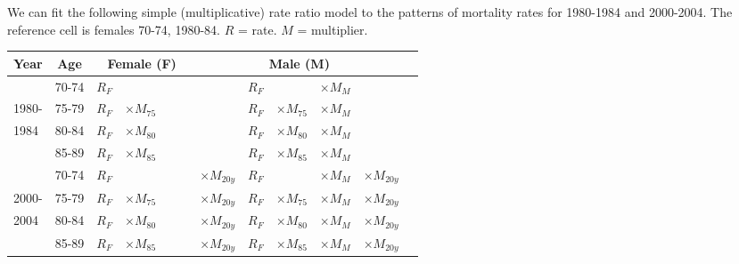 \documentclass[10pt,handout]{beamer}\usepackage[]{graphicx}\usepackage[]{color}
\begin{document}
\begin{frame}
\tiny
\vspace*{-0.1in}
We can fit the following simple (multiplicative) rate ratio model to the patterns of mortality rates  for 1980-1984 and  2000-2004. The reference cell is females 70-74, 1980-84. $R$ = rate. $M$ = multiplier.

\begin{tabular}{|l c | l l  l  l  | l l l l | l |}
	\hline
	Year  & Age & \multicolumn{3}{c}{Female (F)} & &   \multicolumn{3}{c}{Male (M)} & \\ 
	\hline
	& 70-74 &  $R_{F}$ & & & & $R_{F}$ & & $\times M_{M}$  & \\
	1980- & 75-79 &  $R_{F}$ & $ \times M_{75}$ & &   & $R_{F}$ & $\times M_{75}$ & $\times M_{M}$ & \\
	1984 & 80-84 & $R_{F}$ & $ \times M_{80}$ &  & &  $R_{F}$ & $ \times M_{80}$ & $ \times M_{M}$ & \\
	& 85-89 & $R_{F}$ & $ \times M_{85}$ &  & &  $R_{F}$ & $ \times M_{85}$ & $ \times M_{M}$ & \\ 
	\hline
	& 70-74 &  $R_{F}$ &  & & $\times M_{20y}$  &  $R_{F}$ & & $  \times M_{M}$  & $\times M_{20y}$\\
	2000- & 75-79 &  $R_{F} $ & $\times M_{75}$ & & $\times M_{20y}$ &  $R_{F}$ & $ \times M_{75}$ & $ \times M_{M}$& $\times M_{20y}$ \\
	2004      & 80-84 & $R_{F}$ & $ \times M_{80}$ & & $\times M_{20y}$ &   $R_{F}$ & $ \times M_{80}$ & $ \times M_{M}$ & $\times M_{20y}$ \\
	& 85-89 & $R_{F}$ & $ \times M_{85}$ & \ \ \ & $\times M_{20y}$&   $R_{F}$ & $\times M_{85}$ & $\times M_{M}$ & $\times M_{20y}$ \\
	\hline
\end{tabular}



\end{frame}
\end{document}
